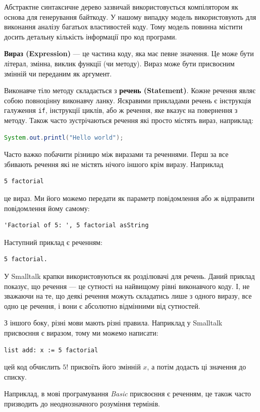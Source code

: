 \documentclass[12pt,a4paper]{article}
\begin{document}
Абстрактне синтаксичне дерево зазвичай використовується компілятором як основа для генерування байткоду. У нашому  випадку модель використовують для виконання аналізу багатьох властивостей коду. Тому модель повинна містити досить детальну кількість інформації про код програми.

\textbf{Вираз (Expression)} --- це частина коду, яка має певне значення. Це може бути літерал, змінна, виклик функції (чи методу). Вираз може бути присвоєним змінній чи переданим як аргумент.

Виконавче тіло методу складається з \textbf{речень (Statement)}. Кожне речення являє собою повноцінну виконавчу ланку. Яскравими прикладами речень є інструкція галуження \lstinline$if$, інструкції циклів, або ж речення, яке вказує на повернення з методу. Також часто зустрічаються речення які просто містять вираз, наприклад:
\begin{lstlisting}[language=Java]
System.out.printl("Hello world");
\end{lstlisting}

Часто важко побачити різницю між виразами та реченнями. Перш за все збивають речення які не містять нічого іншого крім виразу. Наприклад
\begin{lstlisting}[language=Smalltalk]
5 factorial
\end{lstlisting}
це вираз. Ми його можемо передати як параметр повідомлення або ж відправити повідомлення йому самому:
\begin{lstlisting}[language=Smalltalk]
'Factorial of 5: ', 5 factorial asString
\end{lstlisting}
Наступний приклад є реченням:
\begin{lstlisting}[language=Smalltalk]
5 factorial.
\end{lstlisting}
У Smalltalk крапки використовуються як розділювачі для речень. Даний приклад показує, що речення --- це сутності на найвищому рівні виконавчого коду. І, не зважаючи на те, що деякі речення можуть складатись лише з одного виразу, все одно це речення, і вони є абсолютно відмінними від сутностей.

З іншого боку, різні мови мають різні правила. Наприклад у Smalltalk присвоєння є виразом, тому ми можемо написати:
\begin{lstlisting}[language=Smalltalk]
list add: x := 5 factorial
\end{lstlisting}
цей код обчислить $5!$ присвоїть його змінній $x$, а потім додасть ці значення до списку.

Наприклад, в мові програмування \emph{Basic} присвоєння є реченням, це також часто призводить до неоднозначного розуміння термінів.
\end{document}
